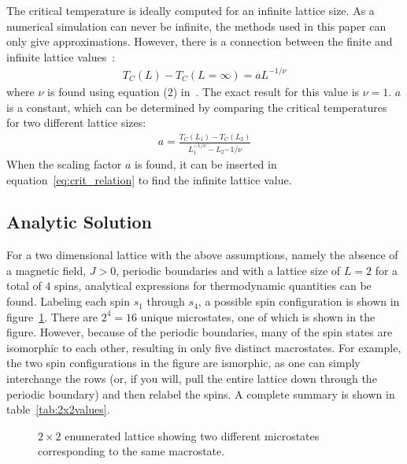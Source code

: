 \documentclass[aps,reprint]{revtex4-1}
\begin{document}
The critical temperature is ideally computed for an infinite lattice size. As a
numerical simulation can never be infinite, the methods used in this paper can
only give approximations. However, there is 
a connection between the finite and infinite lattice values~\cite{physicslectures}:
\begin{align}\label{eq:crit_relation}
  T_C(L) - T_C(L = \infty) = a L^{-1/\nu}
\end{align}
where $\nu$ is found using equation (2) in~\cite{physicslectures}. The exact result for
this value is $\nu = 1$. $a$ is a constant, which can be determined by comparing
the critical temperatures for two different lattice sizes:
\begin{align}\label{eq:scalingfactor}
  a = \frac{T_C(L_1) - T_C(L_2)}{L_1^{-1/\nu} - L_2{-1/\nu}}
\end{align}
When the scaling factor $a$ is found, it can be inserted in equation~\ref{eq:crit_relation}
to find the infinite lattice value.
\subsection{Analytic Solution}
\label{sec:analytic-solution-}

For a two dimensional lattice with the above assumptions, namely the absence of a magnetic field, \(J>0\),
periodic boundaries and with a lattice size of \(L=2\) for a total of \(4\)
spins, analytical expressions for thermodynamic quantities can be found.
Labeling each spin \(s_{1}\) through \(s_{4}\), a possible spin configuration is
shown in figure~\ref{fig:22lattice}. There are \(2^{4}=16\) unique microstates, one
of which is shown in the figure. However, because of the periodic boundaries,
many of the spin states are isomorphic to each other, resulting in only five
distinct macrostates. For example, the two spin configurations in the figure are
ismorphic, as one can simply interchange the rows (or, if you will, pull the
entire lattice down through the periodic boundary) and then relabel the spins. A
complete summary is shown in table~\ref{tab:2x2values}.

\begin{figure}[H]
  \centering
  \caption{$2 \times 2$ enumerated lattice showing two different microstates
    corresponding to the same macrostate.}
  \label{fig:22lattice}
\end{figure}
\end{document}
